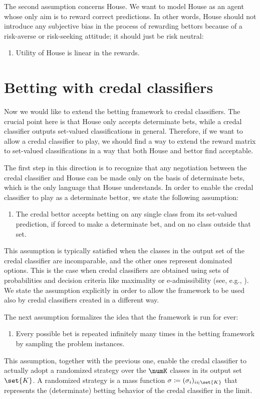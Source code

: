\documentclass[a4paper,10pt,reqno]{amsart}
\theoremstyle{remark}
\begin{document}
The second assumption concerns House. We want to model House as an agent whose only aim is to reward correct predictions. In other words, House should not introduce any subjective bias in the process of rewarding bettors because of a risk-averse or risk-seeking attitude; it should just be risk neutral:
\begin{enumerate}[font=\normalfont,label=(A2)]
\item\label{hp:A2} Utility of House is linear in the rewards.
\end{enumerate}

\section{Betting with credal classifiers}\label{sec:framext}

Now we would like to extend the betting framework to credal classifiers. The crucial point here is that House only accepts determinate bets, while a credal classifier outputs set-valued classifications in general. Therefore, if we want to allow a credal classifier to play, we should find a way to extend the reward matrix to set-valued classifications in a way that both House and bettor find acceptable. 

The first step in this direction is to recognize that any negotiation between the credal classifier and House can be made only on the basis of determinate bets, which is the only language that House understands. In order to enable the credal classifier to play as a determinate bettor, we state the following assumption:
\begin{enumerate}[font=\normalfont,label=(A3)]
\item\label{hp:A3} The credal bettor accepts betting on any single class from its set-valued prediction, if forced to make a determinate bet, and on no class outside that set.
\end{enumerate}
This assumption is typically satisfied when the classes in the output set of the credal classifier are incomparable, and the other ones represent dominated options. This is the case when credal classifiers are obtained using sets of probabilities and decision criteria like maximality or e-admissibility (see, e.g., \cite[Section~3.9]{walley1991}). We state the assumption explicitly in order to allow the framework to be used also by credal classifiers created in a different way.

The next assumption formalizes the idea that the framework is run for ever:
\begin{enumerate}[font=\normalfont,label=(A4)]
\item\label{hp:A4} Every possible bet is repeated infinitely many times in the betting framework by sampling the problem instances.
\end{enumerate}
This assumption, together with the previous one, enable the credal classifier to actually adopt a randomized strategy over the $\numK$ classes in its output set $\set{K}$. A randomized strategy is a mass function $\sigma\coloneqq(\sigma_i)_{i\in\set{K}}$ that represents the (determinate) betting behavior of the credal classifier in the limit. 
\end{document}
